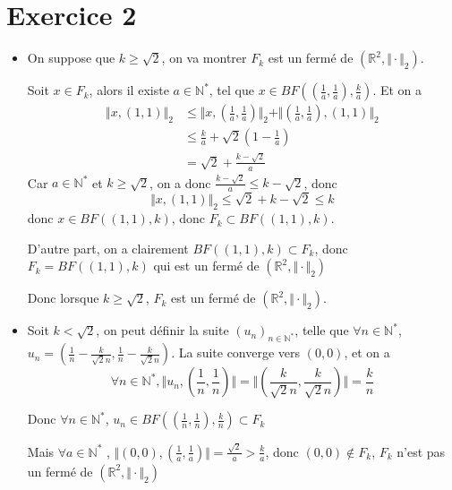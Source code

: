 \documentclass[a4paper,12pt]{book}
\begin{document}
\section{Exercice 2}
\begin{itemize}
    \item On suppose que $k \geq \sqrt{2}$, on va montrer $F_k$ est un fermé de $(\mathbb{R}^2, \Vert\cdot\Vert_2)$.
    
    Soit $x \in F_k$, alors il existe $a \in \mathbb{N}^*$, tel que $x \in BF((\frac{1}{a},\frac{1}{a}),\frac{k}{a})$. Et on a 
    \begin{align*}
    \Vert x,(1,1)\Vert_2&\leq \Vert x,(\frac{1}{a},\frac{1}{a})\Vert_2+\Vert (\frac{1}{a},\frac{1}{a}),(1,1)\Vert_2\\
    & \leq \frac{k}{a}+\sqrt{2}(1-\frac{1}{a})\\
    &=\sqrt{2}+\frac{k-\sqrt{2}}{a}
    \end{align*}
    Car $a \in \mathbb{N}^*$ et $k \geq \sqrt{2}$, on a donc $\frac{k-\sqrt{2}}{a}\leq k-\sqrt{2}$, donc 
    $$
    \Vert x,(1,1)\Vert_2 \leq \sqrt{2}+k-\sqrt{2} \leq k
    $$
    donc $x \in BF((1,1),k)$, donc $F_k \subset BF((1,1),k)$. 

    D'autre part, on a clairement $ BF((1,1),k)  \subset F_k$, donc $F_k = BF((1,1),k)$ qui est un fermé de $(\mathbb{R}^2, \Vert\cdot\Vert_2)$
    
    Donc lorsque $k \geq \sqrt{2}$, $F_k$ est un fermé de $(\mathbb{R}^2, \Vert\cdot\Vert_2)$.
    \item Soit $k < \sqrt{2}$, on peut définir la suite $(u_n)_{n \in \mathbb{N}^*}$, 
    telle que $\forall n \in \mathbb{N}^*$, $u_n=(\frac{1}{n}-\frac{k}{\sqrt{2}n},\frac{1}{n}-\frac{k}{\sqrt{2}n})$. La suite converge vers $(0,0)$, et on a 
    $$\forall n \in \mathbb{N}^*, \Vert u_n,(\frac{1}{n},\frac{1}{n})\Vert=\Vert(\frac{k}{\sqrt{2}n},\frac{k}{\sqrt{2}n})\Vert=\frac{k}{n}$$
    
    Donc $\forall n \in \mathbb{N}^*$, $u_n \in BF((\frac{1}{n},\frac{1}{n}),\frac{k}{n}) \subset F_k$
    
    Mais $ \forall a \in \mathbb{N}^*$ , $\Vert(0,0),(\frac{1}{a},\frac{1}{a})\Vert=\frac{\sqrt{2}}{a}>\frac{k}{a}$, donc 
    $(0,0) \notin F_k$, $F_k$ n'est pas un fermé de $(\mathbb{R}^2, \Vert\cdot\Vert_2)$

\end{itemize}
\end{document}
